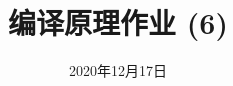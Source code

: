 \documentclass[a4paper, justified]{tufte-handout}
\title{编译原理作业 (6)}
\date{2020年12月17日}
\begin{document}
\maketitle
\noplagiarism %
\begin{abstract}
\end{abstract}
\beginrequired
\end{document}
